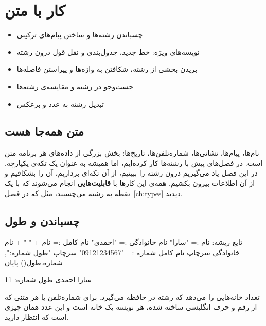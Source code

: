 \chapter{کار با متن}\label{ch:strings}

\begin{goals}
\begin{itemize}
  \item چسباندن رشته‌ها و ساختن پیام‌های ترکیبی
  \item نویسه‌های ویژه: خط جدید، جدول‌بندی و نقل قول درون رشته
  \item بریدن بخشی از رشته، شکافتن به واژه‌ها و پیراستن فاصله‌ها
  \item جست‌وجو در رشته و مقایسه‌ی رشته‌ها
  \item تبدیل رشته به عدد و برعکس
\end{itemize}
\end{goals}

\section{متن همه‌جا هست}

نام‌ها، پیام‌ها، نشانی‌ها، شماره‌تلفن‌ها، تاریخ‌ها: بخش بزرگی از داده‌های
هر برنامه متن است. در فصل‌های پیش با رشته‌ها کار کرده‌ایم، اما همیشه به
عنوان یک تکه‌ی یکپارچه. در این فصل یاد می‌گیریم درون رشته را ببینیم، از آن
تکه‌ای برداریم، آن را بشکافیم و از آن اطلاعات بیرون بکشیم. همه‌ی این کارها
با \textbf{قابلیت‌هایی} انجام می‌شوند که با یک نقطه به رشته می‌چسبند، مثل
 که در فصل~\ref{ch:types} دیدید.

\section{چسباندن و طول}

\begin{salamfa}
تابع ریشه:
    نام := "سارا"
    نام خانوادگی := "احمدی"
    نام کامل := نام + " " + نام خانوادگی
    سرچاپ نام کامل
    شماره := "09121234567"
    سرچاپ "طول شماره:", شماره.طول()
پایان
\end{salamfa}

\begin{outputfa}
سارا احمدی
طول شماره: 11
\end{outputfa}

 تعداد خانه‌هایی را می‌دهد که رشته در حافظه می‌گیرد. برای
شماره‌تلفن یا هر متنی که از رقم و حرف انگلیسی ساخته شده، هر نویسه یک خانه
است و این عدد همان چیزی است که انتظار دارید.

